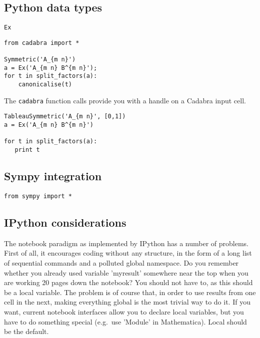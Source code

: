 \documentclass[11pt]{article}
\begin{document}
\subsection{Python data types}

\begin{description}
\item[{\tt Ex}] 
\end{description}


\begin{lstlisting}
from cadabra import *

Symmetric('A_{m n}')
a = Ex('A_{m n} B^{m n}');
for t in split_factors(a):
    canonicalise(t)
\end{lstlisting}

The {\tt cadabra} function calls provide you with a handle on a
Cadabra input cell.

\begin{lstlisting}
TableauSymmetric('A_{m n}', [0,1])
a = Ex('A_{m n} B^{m n}')

for t in split_factors(a):
   print t   
\end{lstlisting}


\subsection{Sympy integration}

\begin{lstlisting}
from sympy import *
\end{lstlisting}


\subsection{IPython considerations}

The notebook paradigm as implemented by IPython has a number of
problems. First of all, it encourages coding without any structure, in
the form of a long list of sequential commands and a polluted global
namespace. Do you remember whether you already used variable
'myresult' somewhere near the top when you are working 20 pages down
the notebook? You should not have to, as this should be a local
variable. The problem is of course that, in order to use results from
one cell in the next, making everything global is the most trivial way
to do it. If you want, current notebook interfaces allow you to
declare local variables, but you have to do something special
(e.g.~use 'Module' in Mathematica). Local should be the default.
\end{document}
